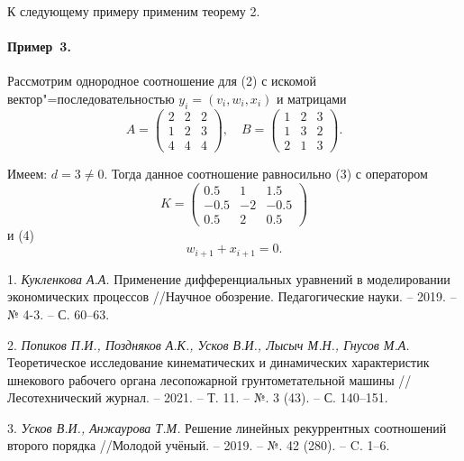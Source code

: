 К следующему примеру применим теорему 2.

\paragraph{Пример~3.}
Рассмотрим однородное соотношение для (2) с искомой вектор"=последовательностью $y_i=(v_i, w_i, x_i)$ и матрицами
\[A=\begin{pmatrix}
2&2&2\\
1&2&3\\
4&4&4
\end{pmatrix}, \quad B= \begin{pmatrix}
1&2&3\\
1&3&2\\
2&1&3
\end{pmatrix}.\]

Имеем: $d=3\ne0$. Тогда данное соотношение равносильно (3) с оператором
\[K=\begin{pmatrix}
 0.5 &  1 &  1.5\\
-0.5 & -2 & -0.5\\
 0.5 &  2 &  0.5
\end{pmatrix}\]
и (4)
\[w_{i+1}+x_{i+1}=0.\]

\litlist

1. {\it Кукленкова А.А.} Применение дифференциальных уравнений в моделировании экономических процессов //Научное обозрение. Педагогические науки. – 2019. – № 4-3. – С. 60–63.

2. {\it Попиков П.И., Поздняков А.К., Усков В.И., Лысыч М.Н., Гнусов М.А.} Теоретическое исследование кинематических и динамических характеристик шнекового рабочего органа лесопожарной грунтометательной машины //Лесотехнический журнал. – 2021. – Т. 11. – №. 3 (43). – С. 140–151.

3. {\it Усков В.И., Анжаурова Т.М.} Решение линейных рекуррентных соотношений второго порядка //Молодой учёный. – 2019. – №. 42 (280). – C. 1–6.
